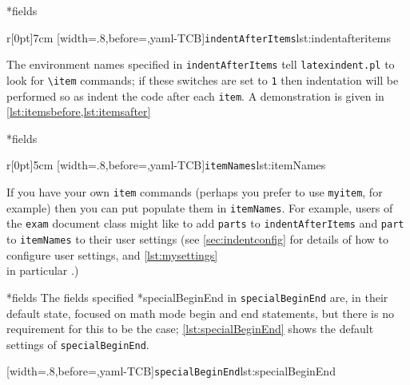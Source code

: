 *{fields}
	\begin{wrapfigure}[5]{r}[0pt]{7cm}
		[width=.8\linewidth,before=\centering,yaml-TCB]{\texttt{indentAfterItems}}{lst:indentafteritems}
	\end{wrapfigure}
	The environment names specified in \texttt{indentAfterItems}  tell
	\texttt{latexindent.pl} to look for \lstinline!\item! commands; if these switches are set to \texttt{1}
	then indentation will be performed so as indent the code after each \texttt{item}.
	A demonstration is given in \cref{lst:itemsbefore,lst:itemsafter}

	\begin{minipage}{.45\textwidth}
	\end{minipage}%
	\hfill
	\begin{minipage}{.45\textwidth}
	\end{minipage}

*{fields}
	\begin{wrapfigure}[5]{r}[0pt]{5cm}
		[width=.8\linewidth,before=\centering,yaml-TCB]{\texttt{itemNames}}{lst:itemNames}
	\end{wrapfigure}
	If you have your own \texttt{item} commands (perhaps you
	prefer to use \texttt{myitem}, for example)
	then you can put populate them in \texttt{itemNames}.
	For example, users of the \texttt{exam} document class might like to add
	\texttt{parts} to \texttt{indentAfterItems} and \texttt{part} to \texttt{itemNames}
	to their user settings (see \vref{sec:indentconfig} for details of how to configure user settings,
	and \vref{lst:mysettings} \\ in particular \label{page:examsettings}.)

*{fields}\label{yaml:specialBeginEnd}
	The fields specified *{specialBeginEnd} in \texttt{specialBeginEnd} are, in their default state, focused on math mode begin and end statements, but
	there is no requirement for this to be the case; \cref{lst:specialBeginEnd} shows the
	default settings of \texttt{specialBeginEnd}.

	[width=.8\linewidth,before=\centering,yaml-TCB]{\texttt{specialBeginEnd}}{lst:specialBeginEnd}

